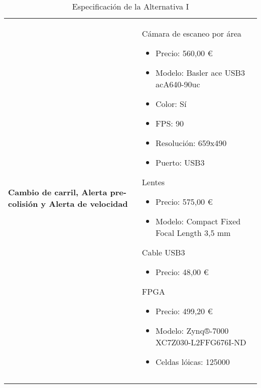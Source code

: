 \begin{center}
\begin{longtable}{p{5cm} p{8cm}}
\\ \hline

\textbf{Cambio de carril, Alerta pre-colisión y Alerta de velocidad} &
Cámara de escaneo por área
\begin{itemize}
    \item Precio: 560,00 \euro
    \item Modelo: Basler ace USB3 acA640-90uc
    \item Color: Sí
    \item FPS: 90
    \item Resolución: 659x490
    \item Puerto: USB3
\end{itemize}
Lentes
\begin{itemize}
    \item Precio: 575,00 \euro
    \item Modelo: Compact Fixed Focal Length 3,5 mm
\end{itemize}
Cable USB3
\begin{itemize}
    \item Precio: 48,00 \euro
\end{itemize}
FPGA
\begin{itemize}
    \item Precio: 499,20 \euro
    \item Modelo: Zynq®-7000 XC7Z030-L2FFG676I-ND
    \item Celdas lóicas: 125000
\end{itemize}
\\
\caption{Especificación de la Alternativa I}\\
\label{tab:altI}
\end{longtable}
\end{center}
